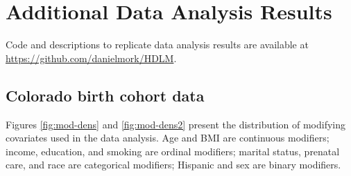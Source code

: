 \documentclass[12pt]{article}
\begin{document}
\clearpage
\section{Additional Data Analysis Results} 
Code and descriptions to replicate data analysis results are available at \url{https://github.com/danielmork/HDLM}.
\subsection{Colorado birth cohort data}
Figures \ref{fig:mod-dens} and \ref{fig:mod-dens2} present the distribution of modifying covariates used in the data analysis. Age and BMI are continuous modifiers; income, education, and smoking are ordinal modifiers; marital status, prenatal care, and race are categorical modifiers; Hispanic and sex are binary modifiers.
\end{document}
